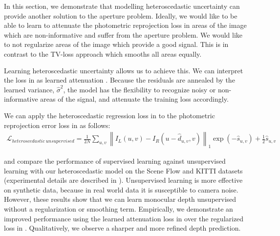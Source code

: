 In this section, we demonstrate that modelling heteroscedastic uncertainty can provide another solution to the aperture problem. Ideally, we would like to be able to learn to attenuate the photometric reprojection loss in areas of the image which are non-informative and suffer from the aperture problem. We would like to not regularize areas of the image which provide a good signal. This is in contrast to the TV-loss approach which smooths all areas equally.

Learning heteroscedastic uncertainty allows us to achieve this. We can interpret the loss in  as learned attenuation \citep{kendall2017uncertainties}. Because the residuals are annealed by the learned variance, $\hat{\sigma}^2$, the model has the flexibility to recognize noisy or non-informative areas of the signal, and attenuate the training loss accordingly.

We can apply the heteroscedastic regression loss in  to the photometric reprojection error loss in  as follows:
\begin{multline}
\mathcal{L}_{heteroscedastic~unsupervised} = \frac{1}{2N} \sum_{u,v} \left\lVert I_L(u,v) - I_R(u-\hat{d}_{u,v},v) \right\rVert_1 \exp (-\hat{s}_{u,v}) + \frac{1}{2}\hat{s}_{u,v}
\label{eqn:aleatoric_unsupervised_loss}
\end{multline}

 and  compare the performance of supervised learning against unsupervised learning with our heteroscedastic model on the Scene Flow and KITTI datasets (experimental details are described in ). Unsupervised learning is more effective on synthetic data, because in real world data it is susceptible to camera noise. However, these results show that we can learn monocular depth unsupervised without a regularization or smoothing term. Empirically, we demonstrate an improved performance using the learned attenuation loss in  over the regularized loss in . Qualitatively, we observe a sharper and more refined depth prediction.

